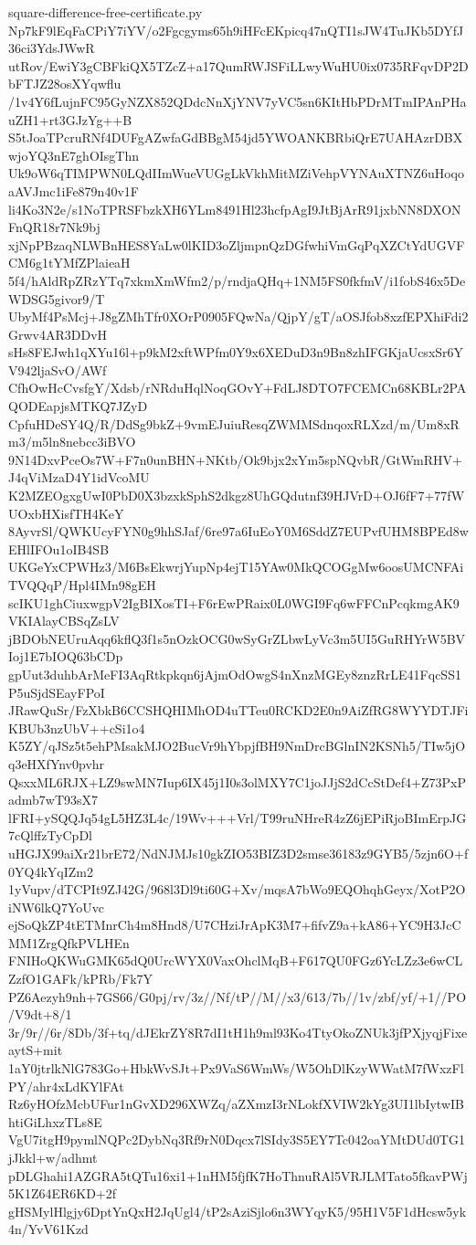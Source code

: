 \documentclass[11pt]{article}
\theoremstyle{definition}
\theoremstyle{remark}
\begin{document}
\begin{filecontents*}[overwrite]{square-difference-free-certificate.py}
Np7kF9lEqFaCPiY7iYV/o2Fgcgyms65h9iHFcEKpicq47nQTI1sJW4TuJKb5DYfJ36ci3YdsJWwR
utRov/EwiY3gCBFkiQX5TZcZ+a17QumRWJSFiLLwyWuHU0ix0735RFqvDP2DbFTJZ28osXYqwflu
/1v4Y6fLujnFC95GyNZX852QDdcNnXjYNV7yVC5sn6KItHbPDrMTmIPAnPHauZH1+rt3GJzYg++B
S5tJoaTPcruRNf4DUFgAZwfaGdBBgM54jd5YWOANKBRbiQrE7UAHAzrDBXwjoYQ3nE7ghOIsgThn
Uk9oW6qTIMPWN0LQdIImWueVUGgLkVkhMitMZiVehpVYNAuXTNZ6uHoqoaAVJmc1iFe879n40v1F
li4Ko3N2e/s1NoTPRSFbzkXH6YLm8491Hl23hcfpAgI9JtBjArR91jxbNN8DXONFnQR18r7Nk9bj
xjNpPBzaqNLWBnHES8YaLw0lKID3oZljmpnQzDGfwhiVmGqPqXZCtYdUGVFCM6g1tYMfZPlaieaH
5f4/hAldRpZRzYTq7xkmXmWfm2/p/rndjaQHq+1NM5FS0fkfmV/i1fobS46x5DeWDSG5givor9/T
UbyMf4PsMcj+J8gZMhTfr0XOrP0905FQwNa/QjpY/gT/aOSJfob8xzfEPXhiFdi2Grwv4AR3DDvH
sHs8FEJwh1qXYu16l+p9kM2xftWPfm0Y9x6XEDuD3n9Bn8zhIFGKjaUcsxSr6YV942ljaSvO/AWf
CfhOwHcCvsfgY/Xdsb/rNRduHqlNoqGOvY+FdLJ8DTO7FCEMCn68KBLr2PAQODEapjsMTKQ7JZyD
CpfuHDeSY4Q/R/DdSg9bkZ+9vmEJuiuResqZWMMSdnqoxRLXzd/m/Um8xRm3/m5ln8nebcc3iBVO
9N14DxvPceOs7W+F7n0unBHN+NKtb/Ok9bjx2xYm5spNQvbR/GtWmRHV+J4qViMzaD4Y1idVcoMU
K2MZEOgxgUwI0PbD0X3bzxkSphS2dkgz8UhGQdutnf39HJVrD+OJ6fF7+77fWUOxbHXisfTH4KeY
8AyvrSl/QWKUcyFYN0g9hhSJaf/6re97a6IuEoY0M6SddZ7EUPvfUHM8BPEd8wEHlIFOu1oIB4SB
UKGeYxCPWHz3/M6BsEkwrjYupNp4ejT15YAw0MkQCOGgMw6oosUMCNFAiTVQQqP/Hpl4IMn98gEH
scIKU1ghCiuxwgpV2IgBIXosTI+F6rEwPRaix0L0WGI9Fq6wFFCnPcqkmgAK9VKIAlayCBSqZsLV
jBDObNEUruAqq6kflQ3f1s5nOzkOCG0wSyGrZLbwLyVc3m5UI5GuRHYrW5BVIoj1E7bIOQ63bCDp
gpUut3duhbArMeFI3AqRtkpkqn6jAjmOdOwgS4nXnzMGEy8znzRrLE41FqcSS1P5uSjdSEayFPoI
JRawQuSr/FzXbkB6CCSHQHIMhOD4uTTeu0RCKD2E0n9AiZfRG8WYYDTJFiKBUb3nzUbV++cSi1o4
K5ZY/qJSz5t5ehPMsakMJO2BucVr9hYbpjfBH9NmDrcBGlnIN2KSNh5/TIw5jOq3eHXfYnv0pvhr
QsxxML6RJX+LZ9swMN7Iup6IX45j1I0s3olMXY7C1joJJjS2dCcStDef4+Z73PxPadmb7wT93sX7
lFRI+ySQQJq54gL5HZ3L4c/19Wv+++Vrl/T99ruNHreR4zZ6jEPiRjoBImErpJG7cQlffzTyCpDl
uHGJX99aiXr21brE72/NdNJMJs10gkZIO53BIZ3D2smse36183z9GYB5/5zjn6O+f0YQ4kYqIZm2
1yVupv/dTCPIt9ZJ42G/968l3Dl9ti60G+Xv/mqsA7bWo9EQOhqhGeyx/XotP2OiNW6lkQ7YoUvc
ejSoQkZP4tETMnrCh4m8Hnd8/U7CHziJrApK3M7+fifvZ9a+kA86+YC9H3JcCMM1ZrgQfkPVLHEn
FNIHoQKWuGMK65dQ0UrcWYX0VaxOhclMqB+F617QU0FGz6YcLZz3e6wCLZzfO1GAFk/kPRb/Fk7Y
PZ6Aezyh9nh+7GS66/G0pj/rv/3z//Nf/tP//M//x3/613/7b//1v/zbf/yf/+1//PO/V9dt+8/1
3r/9r//6r/8Db/3f+tq/dJEkrZY8R7dI1tH1h9ml93Ko4TtyOkoZNUk3jfPXjyqjFixeaytS+mit
1aY0jtrlkNlG783Go+HbkWvSJt+Px9VaS6WmWs/W5OhDlKzyWWatM7fWxzFlPY/ahr4xLdKYlFAt
Rz6yHOfzMcbUFur1nGvXD296XWZq/aZXmzI3rNLokfXVIW2kYg3UI1lbIytwIBhtiGiLhxzTLs8E
VgU7itgH9pymlNQPc2DybNq3Rf9rN0Dqcx7lSIdy3S5EY7Tc042oaYMtDUd0TG1jJkkl+w/adhmt
pDLGhahi1AZGRA5tQTu16xi1+1nHM5fjfK7HoThnuRAl5VRJLMTato5fkavPWj5K1Z64ER6KD+2f
gHSMylHlgjy6DptYnQxH2JqUgl4/tP2sAziSjlo6n3WYqyK5/95H1V5F1dHcsw5yk4n/YvV61Kzd

\end{filecontents*}
\end{document}
